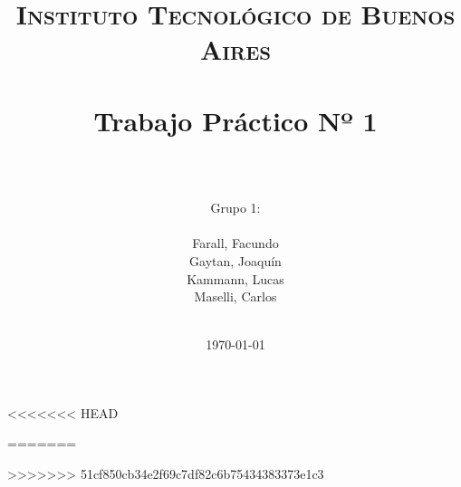 



\title{
	\normalfont \normalsize \textsc{Instituto Tecnológico de Buenos Aires} \\ [25pt]
	\horrule{2pt} \\[0.4cm]
	\huge Trabajo Pr\'actico Nº 1 \\
	\horrule{2pt} \\[0cm]
\author{Grupo 1:\\\\Farall, Facundo\\Gaytan, Joaqu\'in\\Kammann, Lucas\\Maselli, Carlos\\ \\ }
}
\date{\today} %

\maketitle
\newpage



<<<<<<< HEAD
%

=======

%
>>>>>>> 51cf850cb34e2f69c7df82c6b75434383373e1c3


%
%



